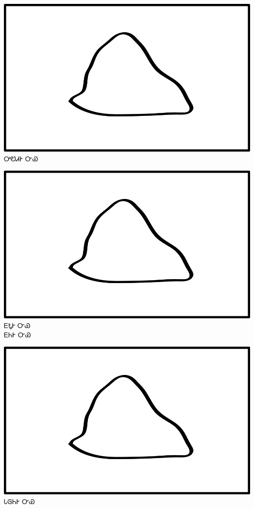 \documentclass[avery5371]{flashcards}%
\begin{document}
\begin{flashcard}{
\includegraphics[width=0.95\columnwidth,height=.51\columnwidth,keepaspectratio]{../artwork/objects-neutral/nvya}
}\Huge ᎤᏬᏗᎨ ᏅᏯ
\end{flashcard}

\begin{flashcard}{
\includegraphics[width=0.95\columnwidth,height=.51\columnwidth,keepaspectratio]{../artwork/objects-neutral/nvya}
}\Huge ᎬᎿᎨ ᏅᏯ\\ᎬᏂᎨ ᏅᏯ
\end{flashcard}

\begin{flashcard}{
\includegraphics[width=0.95\columnwidth,height=.51\columnwidth,keepaspectratio]{../artwork/objects-neutral/nvya}
}\Huge ᏓᎶᏂᎨ ᏅᏯ
\end{flashcard}
\end{document}

